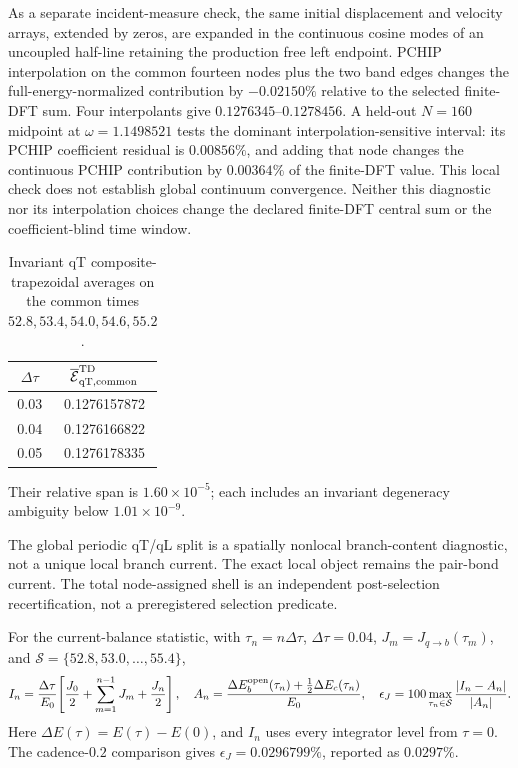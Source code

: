 \documentclass[10pt,aps,pre,onecolumn,notitlepage,nofootinbib]{revtex4-2}
\newcommand{\qT}{\mathrm{qT}}
\begin{document}
As a separate incident-measure check, the same initial displacement and velocity arrays, extended by zeros, are expanded in the continuous cosine modes of an uncoupled half-line retaining the production free left endpoint. PCHIP interpolation on the common fourteen nodes plus the two band edges changes the full-energy-normalized contribution by $-0.02150\%$ relative to the selected finite-DFT sum. Four interpolants give $0.1276345$--$0.1278456$. A held-out $N=160$ midpoint at $\omega=1.1498521$ tests the dominant interpolation-sensitive interval: its PCHIP coefficient residual is $0.00856\%$, and adding that node changes the continuous PCHIP contribution by $0.00364\%$ of the finite-DFT value. This local check does not establish global continuum convergence. Neither this diagnostic nor its interpolation choices change the declared finite-DFT central sum or the coefficient-blind time window.

\begin{table}[htbp]
\squeezetable
\caption{Invariant qT composite-trapezoidal averages on the common times $52.8,53.4,54.0,54.6,55.2$.}
\begin{ruledtabular}\begin{tabular}{cc}
$\Delta\tau$&$\overline{\mathcal E}_{\qT,{\rm common}}^{\rm TD}$\\\hline
0.03&0.1276157872\\
0.04&0.1276166822\\
0.05&0.1276178335\\
\end{tabular}\end{ruledtabular}
\end{table}
Their relative span is $1.60\times10^{-5}$; each includes an invariant degeneracy ambiguity below $1.01\times10^{-9}$.

The global periodic qT/qL split is a spatially nonlocal branch-content diagnostic, not a unique local branch current. The exact local object remains the pair-bond current. The total node-assigned shell is an independent post-selection recertification, not a preregistered selection predicate.

For the current-balance statistic, with $\tau_n=n\Delta\tau$, $\Delta\tau=0.04$, $J_m=J_{q\to b}(\tau_m)$, and $\mathcal S=\{52.8,53.0,\ldots,55.4\}$,
\begin{equation}
 I_n=\frac{\Delta\tau}{E_0}\!\left[\frac{J_0}{2}+\sum_{m=1}^{n-1}J_m+\frac{J_n}{2}\right],\quad
 A_n=\frac{\Delta E_b^{\rm open}(\tau_n)+\frac12\Delta E_c(\tau_n)}{E_0},\quad
 \epsilon_J=100\max_{\tau_n\in\mathcal S}\frac{|I_n-A_n|}{|A_n|}.
\end{equation}
Here $\Delta E(\tau)=E(\tau)-E(0)$, and $I_n$ uses every integrator level from $\tau=0$. The cadence-$0.2$ comparison gives $\epsilon_J=0.0296799\%$, reported as $0.0297\%$.
\end{document}
